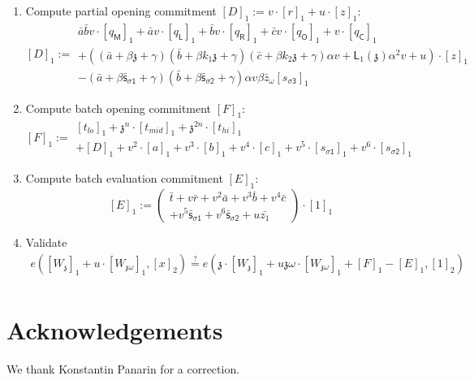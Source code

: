 \documentclass[11pt]{article} %
\newcommand{\chalpoint}{\ensuremath{\mathfrak{z}}\xspace}
\newcommand{\sigpolyevala}{\ensuremath{\mathsf{\bar{s}_{\sigma1}}}\xspace}
\newcommand{\sigpolyevalb}{\ensuremath{\mathsf{\bar{s}_{\sigma2}}}\xspace}
\newcommand{\lagrangepoly}{\ensuremath{\mathsf{L}}\xspace}
\newcommand{\sigcomma}{\ensuremath{[s_{\mathsf{\sigma1}}]_1}\xspace}
\newcommand{\sigcommb}{\ensuremath{[s_{\mathsf{\sigma2}}]_1}\xspace}
\newcommand{\sigcommc}{\ensuremath{[s_{\mathsf{\sigma3}}]_1}\xspace}
\newcommand{\selleftcomm}{\ensuremath{[q_\mathsf{L}]_1}\xspace}
\newcommand{\selrightcomm}{\ensuremath{[q_\mathsf{R}]_1}\xspace}
\newcommand{\seloutcomm}{\ensuremath{[q_\mathsf{O}]_1}\xspace}
\newcommand{\selconstcomm}{\ensuremath{[q_\mathsf{C}]_1}\xspace}
\newcommand{\selmultcomm}{\ensuremath{[q_\mathsf{M}]_1}\xspace}
\begin{document}
\begin{enumerate}
\item	Compute partial opening commitment $[D]_1 := v \cdot [r]_1 + u \cdot [z]_1:$
	$$
	[D]_1 :=
	\begin{array}{l}
	\bar{a}\bar{b} v \cdot \selmultcomm + \bar{a} v \cdot \selleftcomm + \bar{b}v \cdot \selrightcomm + \bar{c}v \cdot \seloutcomm +  v \cdot \selconstcomm \\
	+ \left( (\bar{a} + \beta \chalpoint + \gamma)(\bar{b} + \beta k_1 \chalpoint + \gamma)(\bar{c} + \beta k_2 \chalpoint + \gamma)\alpha v + \lagrangepoly_1(\chalpoint)\alpha^2 v + u\right) \cdot [z]_1\\
	-(\bar{a} + \beta \sigpolyevala + \gamma)(\bar{b} + \beta \sigpolyevalb + \gamma)\alpha v\beta \bar{z}_\omega \sigcommc \end{array}
	$$

	
	\item	Compute batch opening commitment $[F]_1:$
	$$
	[F]_1 := 	\begin{array}{l}
	[t_{lo}]_1
	+ \chalpoint^n \cdot [t_{mid}]_1
	+ \chalpoint^{2n} \cdot [t_{hi}]_1 \\
	+ [D]_1
	+ v^2 \cdot [a]_1
	+ v^3 \cdot [b]_1
	+ v^4 \cdot [c]_1
	+ v^5 \cdot \sigcomma
	+ v^6 \cdot \sigcommb
	\end{array}
	$$
\item 	Compute batch evaluation commitment $[E]_1$:
	$$
	[E]_1 :=
	\left( \begin{array}{l}
	\bar{t}
	+ v \bar{r}
	+ v^2 \bar{a}
	+ v^3 \bar{b}
	+ v^4 \bar{c} \\
	+ v^5 \sigpolyevala
	+ v^6 \sigpolyevalb
	+ u\bar{z_1}
	\end{array}
	\right)
	\cdot [1]_1
	$$
	\item Validate
	$$
	\begin{array}{c}
	e([W_\chalpoint]_1 + u \cdot [W_{\chalpoint \omega}]_1,  [x]_2)
	\overset{?}{=}
	e(\chalpoint \cdot [W_\chalpoint]_1 + u\chalpoint\omega \cdot [W_{\chalpoint \omega}]_1 + [F]_1 - [E]_1, [1]_2) \\
	\end{array}
	$$
\end{enumerate}



\section*{Acknowledgements}
 We thank Konstantin Panarin for a correction. 


    
\end{document}
